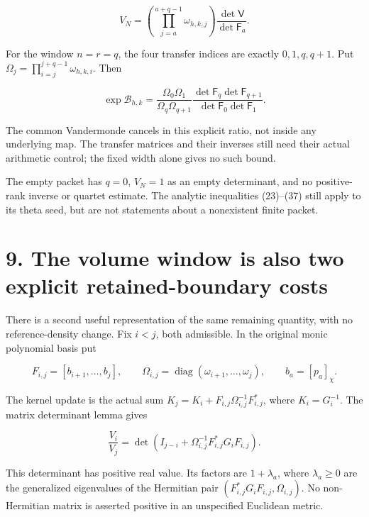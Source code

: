 \[
 V_N=\left(\prod_{j=a}^{a+q-1}\omega_{h,k,j}\right)
                       \frac{\det\mathsf V}{\det\mathsf F_a}.           \tag{41}
\]

For the window \(n=r=q\), the four transfer indices are exactly
\(0,1,q,q+1\). Put \(\Omega_j=\prod_{i=j}^{j+q-1}\omega_{h,k,i}\). Then

\[
 \boxed{
 \exp\mathcal B_{h,k}
 =\frac{\Omega_0\Omega_1}{\Omega_q\Omega_{q+1}}
   \frac{\det\mathsf F_q\det\mathsf F_{q+1}}
        {\det\mathsf F_0\det\mathsf F_1}.
 }                                                                     \tag{42}
\]

The common Vandermonde cancels in this explicit ratio, not inside any
underlying map. The transfer matrices and their inverses still need
their actual arithmetic control; the fixed width alone gives no such
bound.

The empty packet has \(q=0\), \(V_N=1\) as an empty determinant, and no
positive-rank inverse or quartet estimate. The analytic inequalities
(23)--(37) still apply to its theta seed, but are not statements about a
nonexistent finite packet.

\section{9. The volume window is also two explicit retained-boundary
costs}\label{the-volume-window-is-also-two-explicit-retained-boundary-costs}

There is a second useful representation of the same remaining quantity,
with no reference-density change. Fix \(i<j\), both admissible. In the
original monic polynomial basis put

\[
 F_{i,j}=[b_{i+1},\ldots,b_j],\qquad
 \Omega_{i,j}=\operatorname{diag}(\omega_{i+1},\ldots,\omega_j),
 \qquad b_a=[p_a]_\chi.                                                 \tag{43}
\]

The kernel update is the actual sum
\(K_j=K_i+F_{i,j}\Omega_{i,j}^{-1}F_{i,j}^*\), where \(K_i=G_i^{-1}\).
The matrix determinant lemma gives

\[
 \boxed{\frac{V_i}{V_j}
 =\det\!\left(I_{j-i}+\Omega_{i,j}^{-1}F_{i,j}^*G_iF_{i,j}\right).}       \tag{44}
\]

This determinant has positive real value. Its factors are
\(1+\lambda_a\), where \(\lambda_a\ge0\) are the generalized eigenvalues
of the Hermitian pair \((F_{i,j}^*G_iF_{i,j},\Omega_{i,j})\). No
non-Hermitian matrix is asserted positive in an unspecified Euclidean
metric.


